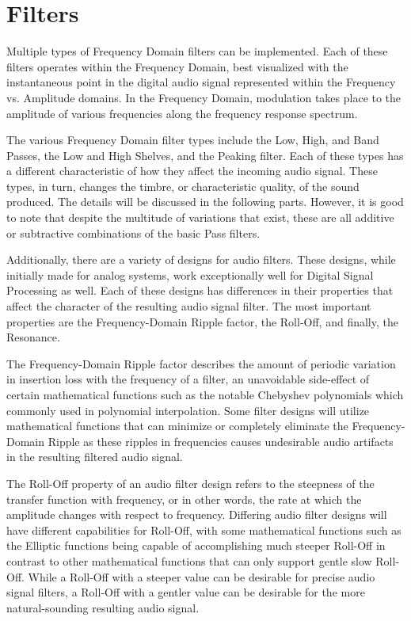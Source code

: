 \documentclass[a4paper,12pt]{report}
\begin{document}
\section{Filters}
Multiple types of Frequency Domain filters can be implemented. Each of these filters operates within the Frequency Domain, best visualized with the instantaneous point in the digital audio signal represented within the Frequency vs. Amplitude domains. In the Frequency Domain, modulation takes place to the amplitude of various frequencies along the frequency response spectrum. 

The various Frequency Domain filter types include the Low, High, and Band Passes, the Low and High Shelves, and the Peaking filter. Each of these types has a different characteristic of how they affect the incoming audio signal. These types, in turn, changes the timbre, or characteristic quality, of the sound produced. The details will be discussed in the following parts. However, it is good to note that despite the multitude of variations that exist, these are all additive or subtractive combinations of the basic Pass filters.

Additionally, there are a variety of designs for audio filters. These designs, while initially made for analog systems, work exceptionally well for Digital Signal Processing as well. Each of these designs has differences in their properties that affect the character of the resulting audio signal filter. The most important properties are the Frequency-Domain Ripple factor, the Roll-Off, and finally, the Resonance.

The Frequency-Domain Ripple factor describes the amount of periodic variation in insertion loss with the frequency of a filter, an unavoidable side-effect of certain mathematical functions such as the notable Chebyshev polynomials which commonly used in polynomial interpolation. Some filter designs will utilize mathematical functions that can minimize or completely eliminate the Frequency-Domain Ripple as these ripples in frequencies causes undesirable audio artifacts in the resulting filtered audio signal.

The Roll-Off property of an audio filter design refers to the steepness of the transfer function with frequency, or in other words, the rate at which the amplitude changes with respect to frequency.  Differing audio filter designs will have different capabilities for Roll-Off, with some mathematical functions such as the Elliptic functions being capable of accomplishing much steeper Roll-Off in contrast to other mathematical functions that can only support gentle slow Roll-Off. While a Roll-Off with a steeper value can be desirable for precise audio signal filters, a Roll-Off with a gentler value can be desirable for the more natural-sounding resulting audio signal.
\end{document}
